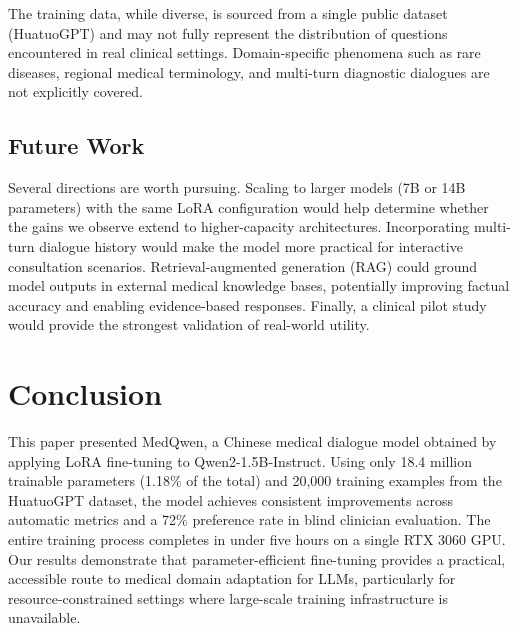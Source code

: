 \documentclass[11pt,a4paper]{article}
\begin{document}
The training data, while diverse, is sourced from a single public dataset (HuatuoGPT) and may not fully represent the distribution of questions encountered in real clinical settings. Domain-specific phenomena such as rare diseases, regional medical terminology, and multi-turn diagnostic dialogues are not explicitly covered.

\subsection{Future Work}

Several directions are worth pursuing. Scaling to larger models (7B or 14B parameters) with the same LoRA configuration would help determine whether the gains we observe extend to higher-capacity architectures. Incorporating multi-turn dialogue history would make the model more practical for interactive consultation scenarios. Retrieval-augmented generation (RAG) could ground model outputs in external medical knowledge bases, potentially improving factual accuracy and enabling evidence-based responses. Finally, a clinical pilot study would provide the strongest validation of real-world utility.

\section{Conclusion}
\label{sec:conclusion}

This paper presented MedQwen, a Chinese medical dialogue model obtained by applying LoRA fine-tuning to Qwen2-1.5B-Instruct. Using only 18.4 million trainable parameters (1.18\% of the total) and 20,000 training examples from the HuatuoGPT dataset, the model achieves consistent improvements across automatic metrics and a 72\% preference rate in blind clinician evaluation. The entire training process completes in under five hours on a single RTX 3060 GPU. Our results demonstrate that parameter-efficient fine-tuning provides a practical, accessible route to medical domain adaptation for LLMs, particularly for resource-constrained settings where large-scale training infrastructure is unavailable.



\end{document}
